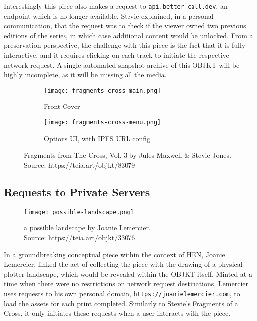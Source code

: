 Interestingly this piece also makes a request to \texttt{api.better-call.dev}, an endpoint which is no longer available. Stevie explained, in a personal communication, that the request was to check if the viewer owned two previous editions of the series, in which case additional content would be unlocked. From a preservation perspective, the challenge with this piece is the fact that it is fully interactive, and it requires clicking on each track to initiate the respective network request. A single automated snapshot archive of this OBJKT will be highly incomplete, as it will be missing all the media.


\begin{figure}[H]
  \centering
  \captionsetup{justification=centering}
  \begin{subfigure}[b]{0.45\textwidth}
    \centering
    \texttt{[image: fragments-cross-main.png]}
    \caption{Front Cover}
    \label{fig:vdp1}
  \end{subfigure}
  \hfill
  \begin{subfigure}[b]{0.45\textwidth}
    \centering
    \texttt{[image: fragments-cross-menu.png]}
    \caption{Options UI, with IPFS URL config}
    \label{fig:vdp2}
  \end{subfigure}
  \caption[Fragments from The Cross, Vol. 3]{Fragments from The Cross, Vol. 3 by Jules Maxwell \& Stevie Jones. \\ Source: https://teia.art/objkt/83079}
  \label{fig:1x1_cross}
\end{figure}


\subsection{Requests to Private Servers}

\begin{figure}[h]
    \centering
    \captionsetup{justification=centering}
    \texttt{[image: possible-landscape.png]}
    \captionsetup{justification=centering}
    \caption[a possible landscape by Joanie Lemercier]{a possible landscape by Joanie Lemercier. \\ Source: https://teia.art/objkt/33076}
    \label{fig:vdp}
\end{figure}

In a groundbreaking conceptual piece within the context of HEN, Joanie Lemercier\footnotemark[2], linked the act of collecting the piece with the drawing of a physical plotter landscape, which would be revealed within the OBJKT itself. Minted at a time when there were no restrictions on network request destinations, Lemercier uses requests to his own personal domain, \texttt{https://joanielemercier.com}, to load the assets for each print completed. Similarly to Stevie's Fragments of a Cross, it only initiates these requests when a user interacts with the piece.

